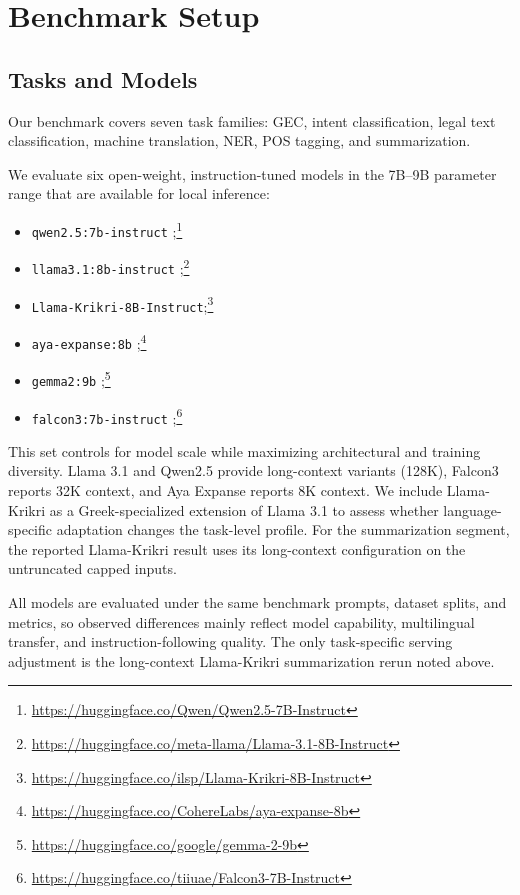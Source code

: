 \documentclass[sigconf,review,anonymous]{acmart}
\begin{document}
\section{Benchmark Setup}
\subsection{Tasks and Models}

Our benchmark covers seven task families: GEC, intent classification, legal text classification, machine translation, NER, POS tagging, and summarization.

We evaluate six open-weight, instruction-tuned models in the 7B--9B parameter range that are available for local inference:
\begin{itemize}
\item \texttt{qwen2.5:7b-instruct} \cite{yang2024qwen25};\footnote{\url{https://huggingface.co/Qwen/Qwen2.5-7B-Instruct}}
\item \texttt{llama3.1:8b-instruct} \cite{grattafiori2024llama};\footnote{\url{https://huggingface.co/meta-llama/Llama-3.1-8B-Instruct}}
\item \texttt{Llama-Krikri-8B-Instruct};\footnote{\url{https://huggingface.co/ilsp/Llama-Krikri-8B-Instruct}}
\item \texttt{aya-expanse:8b} \cite{dang2024aya};\footnote{\url{https://huggingface.co/CohereLabs/aya-expanse-8b}}
\item \texttt{gemma2:9b} \cite{team2024gemma};\footnote{\url{https://huggingface.co/google/gemma-2-9b}}
\item \texttt{falcon3:7b-instruct} \cite{almazrouei2023falcon};\footnote{\url{https://huggingface.co/tiiuae/Falcon3-7B-Instruct}}
\end{itemize}

This set controls for model scale while maximizing architectural and training diversity. Llama 3.1 and Qwen2.5 provide long-context variants (128K), Falcon3 reports 32K context, and Aya Expanse reports 8K context. We include Llama-Krikri as a Greek-specialized extension of Llama 3.1 to assess whether language-specific adaptation changes the task-level profile. For the summarization segment, the reported Llama-Krikri result uses its long-context configuration on the untruncated capped inputs.

All models are evaluated under the same benchmark prompts, dataset splits, and metrics, so observed differences mainly reflect model capability, multilingual transfer, and instruction-following quality. The only task-specific serving adjustment is the long-context Llama-Krikri summarization rerun noted above.
\end{document}
